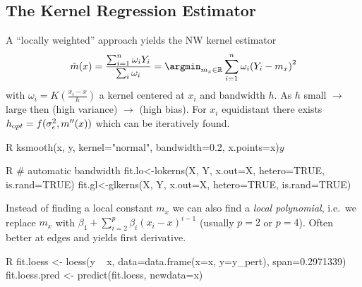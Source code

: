 \subsection{The Kernel Regression Estimator}\label{subsec:kernel_regression_estimator}
\begin{sectionbox}\nospacing{}
  A ``locally weighted'' approach yields the NW kernel estimator
  \begin{equation}\label{eq:nw_regressor}
  \hat m(x) = \frac{\sum_{i=1}^{n} \omega_{i}Y_{i}}{\sum_{i}\omega_{i}} = \argmin_{m_{x} \in \mathbb{R}}\sum_{i=1}^{n}\omega_{i}{(Y_{i}-m_{x})}^{2}
  \end{equation}
  with $\omega_{i} = K\left(\frac{x_{i}-x}{h}\right)$ a kernel centered at $x_{i}$ and bandwidth $h$.
  As $h$ small $\rightarrow$ large then (high variance) $\rightarrow$ (high bias).
  For $x_{i}$ equidistant there exists $h_{\textrm opt} = f(\sigma_{\epsilon}^{2}, m''(x))$ which can be iteratively found.

\begin{mintlinebox}{R}
    ksmooth(x, y, kernel="normal", bandwidth=0.2, x.points=x)$y$
\end{mintlinebox}
\begin{mintlinebox}{R}
  # automatic bandwidth
  fit.lo<-lokerns(X, Y, x.out=X, hetero=TRUE, is.rand=TRUE)
  fit.gl<-glkerns(X, Y, x.out=X, hetero=TRUE, is.rand=TRUE)
\end{mintlinebox}

Instead of finding a local constant $m_{x}$ we can also find a \emph{local polynomial}, i.e.\ we replace $m_{x}$ with $\beta_{1} + \sum_{i=2}^{p} \beta_{i}{(x_{i}-x)}^{i-1}$ (usually $p=2$ or $p=4$).
Often better at edges and yields first derivative.
  \begin{mintlinebox}{R}
  fit.loess <- loess(y ~ x, data=data.frame(x=x, y=y_pert), span=0.2971339)
  fit.loess.pred <- predict(fit.loess, newdata=x)
  \end{mintlinebox}
\end{sectionbox}

